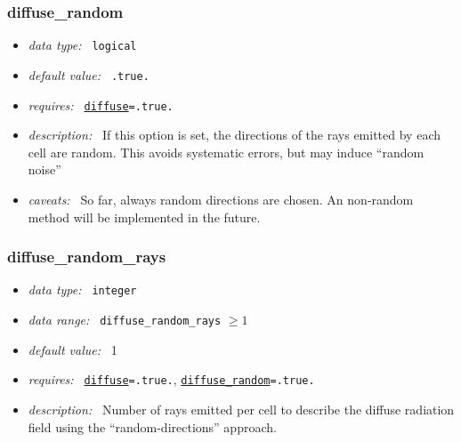 \documentclass[a4paper,10pt]{article}
\begin{document}
\subsubsection{diffuse\_random}
\label{opt:diffuserandom}
\begin{itemize}
 \item \textit{data type:~} \texttt{logical}
 \item \textit{default value:~} \texttt{.true.}
 \item \textit{requires:~} \texttt{\hyperref[opt:diffuse]{diffuse}=.true.}
 \item \textit{description:~} If this option is set, the directions of the rays  
 emitted by each cell  are random. This avoids systematic errors, but may induce 
 ``random noise''
 \item \textit{caveats:~} So far, always random directions are chosen. An 
 non-random method will be implemented in the future.
\end{itemize}



\subsubsection{diffuse\_random\_rays}
\label{opt:diffuserandomrays}
\begin{itemize}
 \item \textit{data type:~} \texttt{integer}
 \item \textit{data range:~} \texttt{diffuse\_random\_rays} $\geq 1$
 \item \textit{default value:~} 1
 \item \textit{requires:~}  \texttt{\hyperref[opt:diffuse]{diffuse}=.true.}, 
 \texttt{\hyperref[opt:diffuserandom]{diffuse\_random}=.true.}
 \item \textit{description:~} Number of rays emitted per cell to describe the  
  diffuse radiation field using the ``random-directions'' approach. 
\end{itemize}
\end{document}
